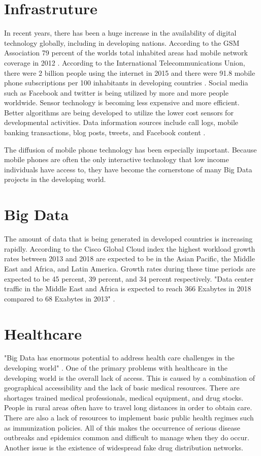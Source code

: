 \documentclass[sigconf]{acmart}
\begin{document}
\section{Infrastruture}
In recent years, there has been a huge increase in the availability of digital technology globally, including in developing nations. According to the GSM Association 79 percent of the worlds total inhabited areas had mobile network coverage in 2012 \cite{DevEcon}. According to the International Telecommunications Union, there were 2 billion people using the internet in 2015 and there were 91.8 mobile phone subscriptions per 100 inhabitants in developing countries \cite{DevEcon}.  Social media such as Facebook and twitter is being utilized by more and more people worldwide. Sensor technology is becoming less expensive and more efficient. Better algorithms are being developed to utilize the lower cost sensors for developmental activities. Data information sources include call logs, mobile banking transactions, blog posts, tweets, and Facebook content \cite{www-google-GloPls}.

The diffusion of mobile phone technology has been especially important.  Because mobile phones are often the only interactive technology that low income individuals have access to, they have become the cornerstone of many Big Data projects in the developing world.

\section{Big Data}
The amount of data that is being generated in developed countries is increasing rapidly.  According to the Cisco Global Cloud index the highest workload growth rates between 2013 and 2018 are expected to be in the Asian Pacific, the Middle East and Africa, and Latin America.  Growth rates during these time periods are expected to be 45 percent, 39 percent, and 34 percent respectively.  "Data center traffic in the Middle East and Africa is expected to reach 366 Exabytes in 2018 compared to 68 Exabytes in 2013" \cite{DevEcon}. 

\section{Healthcare}

"Big Data has enormous potential to address health care challenges in the developing world" \cite{DevEcon}. One of the primary problems with healthcare in the developing world is the overall lack of access. This is caused by a combination of geographical accessibility and the lack of basic medical resources. There are shortages trained medical professionals, medical equipment, and drug stocks. People in rural areas often have to travel long distances in order to obtain care. There are also a lack of resources to implement basic public health regimes such as immunization policies.  All of this makes the occurrence of serious disease outbreaks and epidemics common and difficult to manage when they do occur.  Another issue is the existence of widespread fake drug distribution networks.
\end{document}

